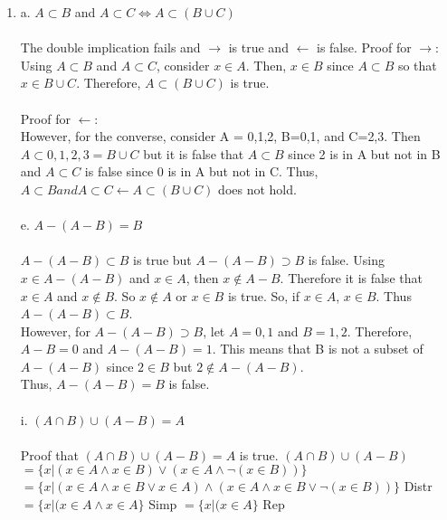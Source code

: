 \documentclass[]{article}
\begin{document}
\begin{enumerate}
    \item a. $A \subset B$ and $A \subset C \iff A \subset (B \cup C)$
    \\\\ The double implication fails and $\longrightarrow$ is true and $\longleftarrow$ is false.
    \newline Proof for $\longrightarrow$:
    \newline Using $A \subset B$ and $A \subset C$, consider $x \in A$. Then, $x \in B$ since $A \subset B$ so that $x \in B \cup C$. Therefore, $A \subset (B \cup C)$ is true.
    \\\\ Proof for $\longleftarrow$:
    \\However, for the converse, consider A = {0,1,2}, B={0,1}, and C={2,3}. Then $A \subset {0,1,2,3} = B \cup C$  but it is false that $A \subset B$ since 2 is in A but not in B and $A \subset C$ is false since 0 is in A but not in C. Thus,$
    A \subset B and  A \subset C \leftarrow A \subset (B \cup  C) $ does not hold.
    \\\\e. $A-(A-B)=B$
    \\\\$A-(A-B) \subset B$ is true but $A-(A-B) \supset B$ is false.
    \newline Using $x \in A-(A-B)$ and $x \in A$, then $x \notin A-B$. Therefore it is false that $x \in A$ and $x \notin B$. So $x \notin A$ or $x \in B$ is true. So, if $x \in A$, $x \in B$. Thus $A-(A-B) \subset B$. \\However, for $A-(A-B) \supset B$, let $A={0,1}$ and $B={1,2}$. Therefore, $A-B={0}$ and $A-(A-B)={1}$. This means that B is not a subset of $A-(A-B)$ since $2 \in B$ but $2 \notin A-(A-B)$.
    \\Thus, $A-(A-B)=B$ is false.
    \\\\i. $(A \cap B) \cup (A-B)=A$
    \\\\Proof that $(A \cap B) \cup (A-B)=A$ is true.
    \newline $(A \cap B) \cup (A-B)$
    \newline $=\{x|(x \in A \land x \in B) \lor (x \in A \land \neg (x \in B))\}$
   \newline $=\{x|(x \in A \land x \in B \lor x \in A) \land (x \in A \land x \in B \lor \neg (x \in B ))\}$ Distr
   \newline $=\{x|(x \in A \land x \in A \}$ Simp
   \newline $=\{x|(x \in A \}$ Rep

\end{enumerate}
\end{document}
